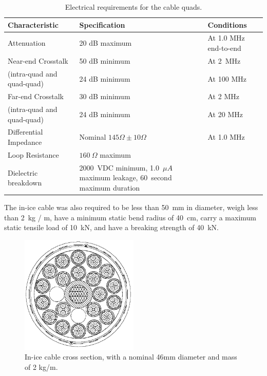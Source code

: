 \begin{table}[h]
  \centering
  \caption{Electrical requirements for the cable quads.} 
  \begin{tabularx}{\textwidth}{ l X  X  }
    \toprule
    Characteristic& Specification & Conditions \\
    \midrule

    Attenuation & 20 dB maximum & At 1.0 MHz end-to-end \\
%

   Near-end Crosstalk& 50 dB minimum & At 2~MHz \\
(intra-quad and quad-quad)&24 dB minimum& At 100 MHz\\
   Far-end Crosstalk & 30 dB minimum & At 2 MHz \\
(intra-quad and quad-quad)&24 dB minimum& At 20 MHz\\


    Differential Impedance & Nominal $145\Omega \pm 10\Omega$ & At 1.0 MHz \\

    Loop Resistance & $160~\Omega$ maximum & \\

    Dielectric breakdown & 2000~VDC minimum, 1.0~$\mu A$ maximum leakage, 60~second
    maximum duration & \\
    \bottomrule  
  \end{tabularx}
  \label{tab:quad_requirements}
\end{table}

 The in-ice cable was also required to be less than 50~mm in
 diameter, weigh less than 2~kg / m, have a minimum static bend radius of 40~cm,
 carry a maximum static tensile load of 10~kN, and have a breaking strength
 of 40~kN.
 
\begin{figure}
  \centering
  \includegraphics[width=0.5\textwidth]{graphics/cables/cable_xsection.png}
  \caption{\label{fig:cable_xsection}In-ice cable cross
    section, with a nominal 46mm diameter and mass of 2 kg/m.} 
\end{figure}

